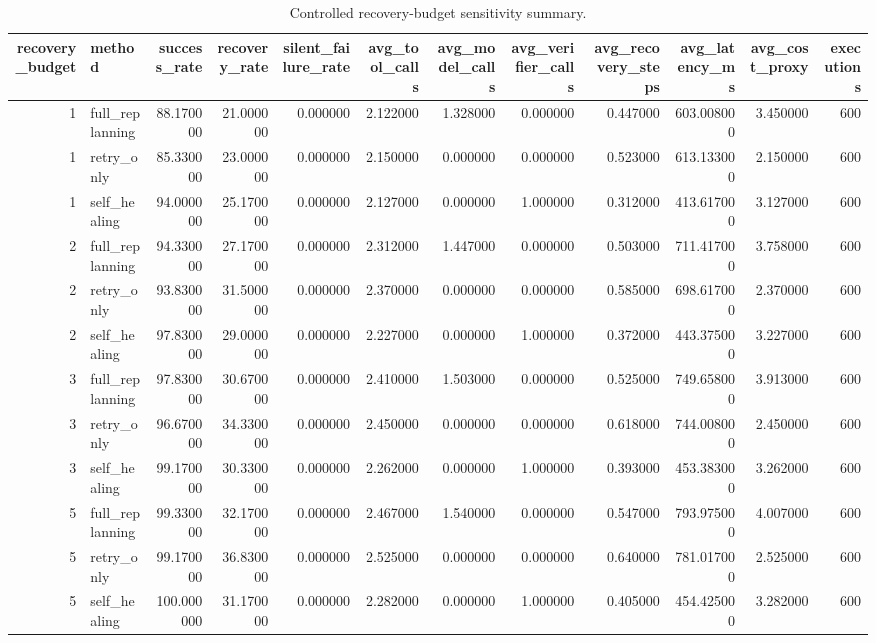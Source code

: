 \begin{table}
\caption{Controlled recovery-budget sensitivity summary.}
\label{tab:controlled_budget_summary}
\begin{tabular}{rlrrrrrrrrrr}
\toprule
recovery_budget & method & success_rate & recovery_rate & silent_failure_rate & avg_tool_calls & avg_model_calls & avg_verifier_calls & avg_recovery_steps & avg_latency_ms & avg_cost_proxy & executions \\
\midrule
1 & full_replanning & 88.170000 & 21.000000 & 0.000000 & 2.122000 & 1.328000 & 0.000000 & 0.447000 & 603.008000 & 3.450000 & 600 \\
1 & retry_only & 85.330000 & 23.000000 & 0.000000 & 2.150000 & 0.000000 & 0.000000 & 0.523000 & 613.133000 & 2.150000 & 600 \\
1 & self_healing & 94.000000 & 25.170000 & 0.000000 & 2.127000 & 0.000000 & 1.000000 & 0.312000 & 413.617000 & 3.127000 & 600 \\
2 & full_replanning & 94.330000 & 27.170000 & 0.000000 & 2.312000 & 1.447000 & 0.000000 & 0.503000 & 711.417000 & 3.758000 & 600 \\
2 & retry_only & 93.830000 & 31.500000 & 0.000000 & 2.370000 & 0.000000 & 0.000000 & 0.585000 & 698.617000 & 2.370000 & 600 \\
2 & self_healing & 97.830000 & 29.000000 & 0.000000 & 2.227000 & 0.000000 & 1.000000 & 0.372000 & 443.375000 & 3.227000 & 600 \\
3 & full_replanning & 97.830000 & 30.670000 & 0.000000 & 2.410000 & 1.503000 & 0.000000 & 0.525000 & 749.658000 & 3.913000 & 600 \\
3 & retry_only & 96.670000 & 34.330000 & 0.000000 & 2.450000 & 0.000000 & 0.000000 & 0.618000 & 744.008000 & 2.450000 & 600 \\
3 & self_healing & 99.170000 & 30.330000 & 0.000000 & 2.262000 & 0.000000 & 1.000000 & 0.393000 & 453.383000 & 3.262000 & 600 \\
5 & full_replanning & 99.330000 & 32.170000 & 0.000000 & 2.467000 & 1.540000 & 0.000000 & 0.547000 & 793.975000 & 4.007000 & 600 \\
5 & retry_only & 99.170000 & 36.830000 & 0.000000 & 2.525000 & 0.000000 & 0.000000 & 0.640000 & 781.017000 & 2.525000 & 600 \\
5 & self_healing & 100.000000 & 31.170000 & 0.000000 & 2.282000 & 0.000000 & 1.000000 & 0.405000 & 454.425000 & 3.282000 & 600 \\
\bottomrule
\end{tabular}
\end{table}
